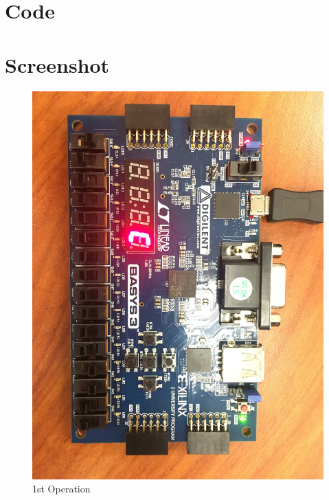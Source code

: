 \documentclass[11pt]{article}
\newcommand{\Verilog}[2][]{%
	
}
\begin{document}
\section*{Code}
\Verilog[firstline=23,caption=Mux2 Implementation]{../verilog_code/mux2.sv}
\Verilog[firstline=23,caption=Mux4 Implementation]{../verilog_code/mux4.sv}
\Verilog[firstline=23,caption=Anode Decoder Implementation]{../verilog_code/an_decoder.sv}
\Verilog[firstline=23,caption=Top Level Implementation]{../verilog_code/sseg4.sv}
\Verilog[firstline=23,caption=On-Board Implementation]{../verilog_code/sseg4_manual.sv}

\section*{Screenshot}
\begin{figure}[ht]
	\centering
	\includegraphics[width=12cm]{"board/step1"}
	\caption{1st Operation}
\end{figure}
\end{document}
